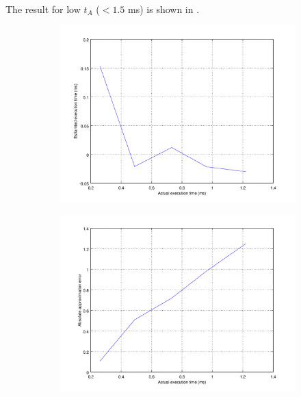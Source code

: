 The result for  low $t_A$ ($<1.5$ ms) is shown in .

\begin{figure}[ht!]
	\center
	\begin{subfigure}{0.6\linewidth}
	\center
	\includegraphics[width=\linewidth]{fig/lowtaest.png}
	\end{subfigure}
	\begin{subfigure}{0.45\linewidth}
	\center
	\includegraphics[width=\linewidth]{fig/lowabstaerr.png}
	\end{subfigure}
	\begin{subfigure}{0.45\linewidth}

\end{subfigure}
\end{figure}
